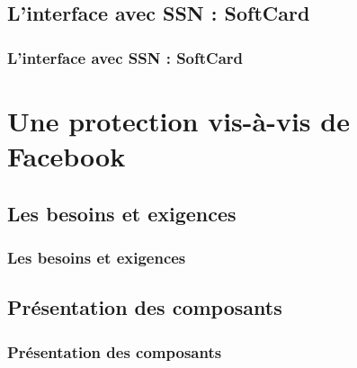 \documentclass{beamer}
\begin{document}
\subsection{L'interface avec SSN : SoftCard}
\begin{frame}
    \frametitle{L'interface avec SSN : SoftCard}
    \begin{block}{}
    \end{block}
\end{frame}

\section{Une protection vis-à-vis de Facebook}

\subsection{Les besoins et exigences}
\begin{frame}
    \frametitle{Les besoins et exigences}
    \begin{block}{ }
    \end{block}
\end{frame}

\subsection{Présentation des composants}
\begin{frame}
    \frametitle{Présentation des composants}
    \begin{block}{ }
    \end{block}
\end{frame}
\end{document}
